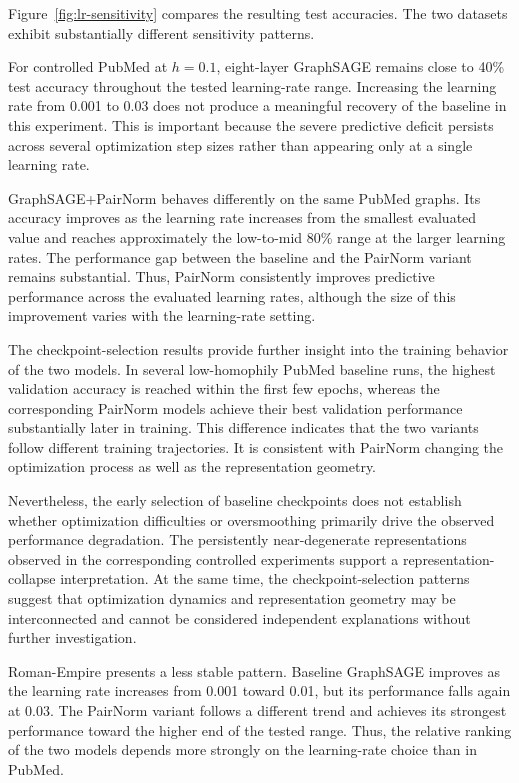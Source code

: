 \documentclass[english]{lni}
\begin{document}
Figure~\ref{fig:lr-sensitivity} compares the resulting test accuracies. The two datasets exhibit substantially different sensitivity patterns.

For controlled PubMed at $h=0.1$, eight-layer GraphSAGE remains close to 40\% test accuracy throughout the tested learning-rate range. Increasing the learning rate from 0.001 to 0.03 does not produce a meaningful recovery of the baseline in this experiment. This is important because the severe predictive deficit persists across several optimization step sizes rather than appearing only at a single learning rate.

GraphSAGE+PairNorm behaves differently on the same PubMed graphs. Its accuracy improves as the learning rate increases from the smallest evaluated value and reaches approximately the low-to-mid 80\% range at the larger learning rates. The performance gap between the baseline and the PairNorm variant remains substantial. Thus, PairNorm consistently improves predictive performance across the evaluated learning rates, although the size of this improvement varies with the learning-rate setting.

The checkpoint-selection results provide further insight into the training behavior of the two models. In several low-homophily PubMed baseline runs, the highest validation accuracy is reached within the first few epochs, whereas the corresponding PairNorm models achieve their best validation performance substantially later in training. This difference indicates that the two variants follow different training trajectories. It is consistent with PairNorm changing the optimization process as well as the representation geometry.

Nevertheless, the early selection of baseline checkpoints does not establish whether optimization difficulties or oversmoothing primarily drive the observed performance degradation. The persistently near-degenerate representations observed in the corresponding controlled experiments support a representation-collapse interpretation. At the same time, the checkpoint-selection patterns suggest that optimization dynamics and representation geometry may be interconnected and cannot be considered independent explanations without further investigation.

Roman-Empire presents a less stable pattern. Baseline GraphSAGE improves as the learning rate increases from 0.001 toward 0.01, but its performance falls again at 0.03. The PairNorm variant follows a different trend and achieves its strongest performance toward the higher end of the tested range. Thus, the relative ranking of the two models depends more strongly on the learning-rate choice than in PubMed.
\end{document}
